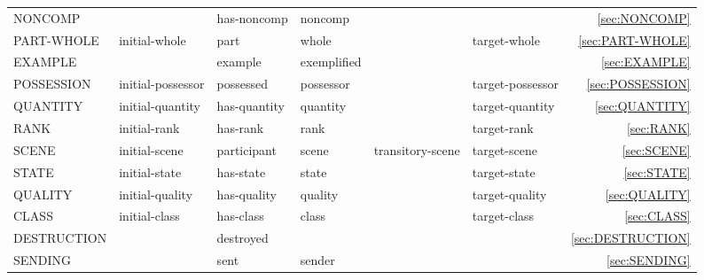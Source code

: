 \documentclass[a4paper]{article}
\newcommand{\fr}[1]{\textsf{#1}}
\newcommand{\rl}[1]{\textsf{#1}}
\newcommand{\Sub}{\textnoto{└} }
\newcommand{\SubSub}{\textcolor{white}{\Sub}\Sub}
\newcommand{\SubSubSub}{\textcolor{white}{\Sub}\SubSub}
\begin{document}
\begin{table}
{\begin{NiceTabular}{llllllr}
            \Sub{} \fr{NONCOMP} & & \rl{has-noncomp} & \rl{noncomp} & & & \ref{sec:NONCOMP} \\

            \Sub{} \fr{PART-WHOLE} & \rl{initial-whole} & \rl{part} & \rl{whole} & & \rl{target-whole} & \ref{sec:PART-WHOLE} \\
            \SubSub{} \fr{EXAMPLE} & \rl{} & \rl{example} & \rl{exemplified} & & \rl{} & \ref{sec:EXAMPLE} \\

            \Sub{} \fr{POSSESSION} & \rl{initial-possessor} & \rl{possessed} & \rl{possessor} & & \rl{target-possessor} & \ref{sec:POSSESSION} \\

            \Sub{} \fr{QUANTITY} & \rl{initial-quantity} & \rl{has-quantity} & \rl{quantity} & & \rl{target-quantity} & \ref{sec:QUANTITY} \\

            \Sub{} \fr{RANK} & \rl{initial-rank} & \rl{has-rank} & \rl{rank} & & \rl{target-rank} & \ref{sec:RANK} \\

            \Sub{} \fr{SCENE} & \rl{initial-scene} & \rl{participant} & \rl{scene} & \rl{transitory-scene} & \rl{target-scene} & \ref{sec:SCENE} \\

            \Sub{} \fr{STATE} & \rl{initial-state} & \rl{has-state} & \rl{state} & & \rl{target-state} & \ref{sec:STATE} \\
            \SubSub{} \fr{QUALITY} & \rl{initial-quality}& \rl{has-quality} & \rl{quality} & & \rl{target-quality} & \ref{sec:QUALITY} \\
            \SubSubSub{} \fr{CLASS} & \rl{initial-class} & \rl{has-class} & \rl{class} & & \rl{target-class} & \ref{sec:CLASS} \\
            \SubSub{} \fr{DESTRUCTION} & & \rl{destroyed} & & & & \ref{sec:DESTRUCTION} \\

            \Sub{} \fr{SENDING} & & \rl{sent} & \rl{sender} & & & \ref{sec:SENDING} \\


\end{NiceTabular}}
\end{table}
\end{document}
